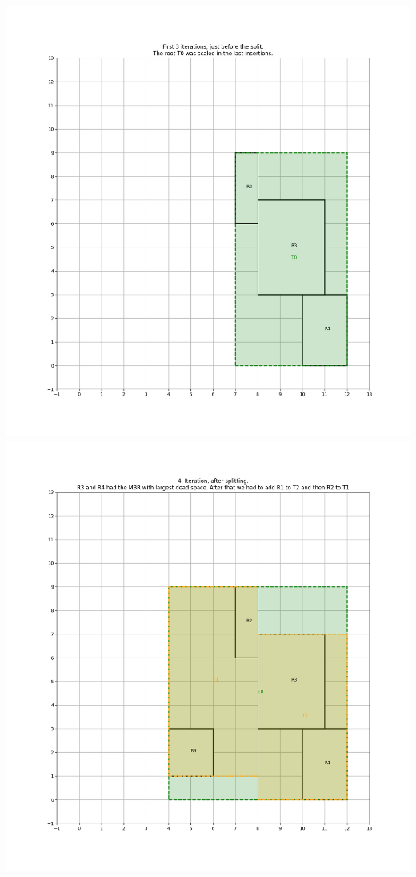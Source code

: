     \begin{center}
        \includegraphics[scale=0.5]{./A1 figs/iter3.png}
        \includegraphics[scale=0.5]{./A1 figs/iter4.png}

\end{center}

